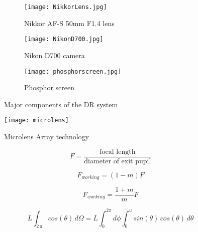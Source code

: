 
\begin{figure}[ht]
	\begin{subfigure}[b]{0.3\linewidth}
		\centering
		\texttt{[image: NikkorLens.jpg]}
		\caption{Nikkor AF-S 50mm F1.4 lens}
		\label{fig:nikonlens}
	\end{subfigure}
	\hspace{0.2cm}
	\begin{subfigure}[b]{0.3\linewidth}
		\centering
		\texttt{[image: NikonD700.jpg]}
		\caption{Nikon D700 camera}
		\label{fig:nikoncamera}
	\end{subfigure}
	\hspace{0.2cm}
	\begin{subfigure}[b]{0.3\linewidth}
		\texttt{[image: phosphorscreen.jpg]}
		\caption{Phosphor screen}
		\label{fig:phosphorscreen}
	\end{subfigure}
\caption{Major components of the DR system}
\label{fig:DRcomponents}
\end{figure}

\begin{figure}
\centering
\texttt{[image: microlens]}
\caption{Microlens Array technology}
\label{fig:microlensarray}
\end{figure}

\begin{equation}\label{eq:Fnumber}
F = \frac{\mbox{focal length}}{\mbox{diameter of exit pupil}}
\end{equation}
	
\begin{equation}\label{eq:workingfn_img}
F_{working} = (1 - m)F
\end{equation}
	
\begin{equation}\label{eq:workingfn_obj}
F_{working} = \frac{1+m}{m}F
\end{equation}
	
\begin{equation}\label{eq:lambertian}
L\int_{2\,\pi} cos( \theta)\, d\Omega = L\int_{0}^{2\pi}d\phi \int_{0}^{u} sin(\theta) \, cos(\theta)\, d\theta
\end{equation}
	

